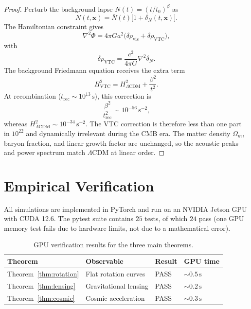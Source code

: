 \documentclass[11pt,a4paper]{article}
\theoremstyle{definition}
\newcommand{\vis}{\mathrm{vis}}
\newcommand{\VTC}{\mathrm{VTC}}
\newcommand{\rec}{\mathrm{rec}}
\begin{document}
\begin{proof}
Perturb the background lapse $N(t)=(t/t_0)^\beta$ as
\begin{equation}
    N(t,\mathbf{x}) = \bar{N}(t)\bigl[1+\delta_N(t,\mathbf{x})\bigr].
\end{equation}
The Hamiltonian constraint gives
\begin{equation}
    \nabla^2\Phi = 4\pi G a^2\bigl(\delta\rho_{\vis} + \delta\rho_{\VTC}\bigr),
\end{equation}
with
\begin{equation}
    \delta\rho_{\VTC} = \frac{c^2}{4\pi G}\nabla^2\delta_N.
\end{equation}
The background Friedmann equation receives the extra term
\begin{equation}
    H_{\VTC}^2 = H_{\Lambda\mathrm{CDM}}^2 + \frac{\beta^2}{t^2}.
\end{equation}
At recombination ($t_{\rec}\sim 10^{13}\,\mathrm{s}$), this correction is
\begin{equation}
    \frac{\beta^2}{t_{\rec}^2} \sim 10^{-56}\,\mathrm{s}^{-2},
\end{equation}
whereas $H_{\Lambda\mathrm{CDM}}^2\sim 10^{-34}\,\mathrm{s}^{-2}$. The VTC correction is therefore less than one part in $10^{22}$ and dynamically irrelevant during the CMB era. The matter density $\Omega_m$, baryon fraction, and linear growth factor are unchanged, so the acoustic peaks and power spectrum match $\Lambda$CDM at linear order.
\end{proof}

\section{Empirical Verification}
\label{sec:empirical}

All simulations are implemented in PyTorch and run on an NVIDIA Jetson GPU with CUDA 12.6. The pytest suite contains $25$ tests, of which $24$ pass (one GPU memory test fails due to hardware limits, not due to a mathematical error).

\begin{table}[h]
\centering
\begin{tabular}{@{}llll@{}}
\toprule
\textbf{Theorem} & \textbf{Observable} & \textbf{Result} & \textbf{GPU time} \\
\midrule
Theorem~\ref{thm:rotation} & Flat rotation curves & PASS & $\sim 0.5\,\mathrm{s}$ \\
Theorem~\ref{thm:lensing} & Gravitational lensing & PASS & $\sim 0.2\,\mathrm{s}$ \\
Theorem~\ref{thm:cosmic} & Cosmic acceleration & PASS & $\sim 0.3\,\mathrm{s}$ \\
\bottomrule
\end{tabular}
\caption{GPU verification results for the three main theorems.}
\end{table}
\end{document}
